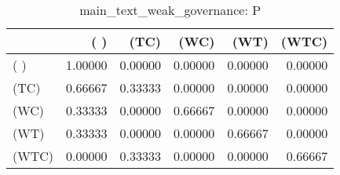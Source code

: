 \begin{table}
\centering
\caption{main_text_weak_governance: P}
\begin{tabular}{lrrrrr}
\toprule
{} &     ( ) &    (TC) &    (WC) &    (WT) &   (WTC) \\
\midrule
( )   & 1.00000 & 0.00000 & 0.00000 & 0.00000 & 0.00000 \\
(TC)  & 0.66667 & 0.33333 & 0.00000 & 0.00000 & 0.00000 \\
(WC)  & 0.33333 & 0.00000 & 0.66667 & 0.00000 & 0.00000 \\
(WT)  & 0.33333 & 0.00000 & 0.00000 & 0.66667 & 0.00000 \\
(WTC) & 0.00000 & 0.33333 & 0.00000 & 0.00000 & 0.66667 \\
\bottomrule
\end{tabular}
\end{table}
